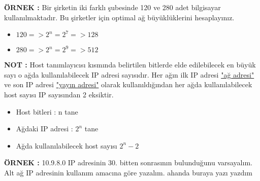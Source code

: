 \textbf{ÖRNEK : }Bir şirketin iki farklı şubesinde 120 ve 280 adet bilgisayar kullanılmaktadır. Bu şirketler için optimal ağ büyüklüklerini hesaplayınız. 

\begin{itemize}
\item[]$120 => 2^n = 2^7 => 128$
\item[]$280 => 2^n = 2^9 => 512$
\end{itemize}

\textbf{NOT : }Host tanımlayıcısı kısmında belirtilen bitlerde elde edilebilecek en büyük sayı o ağda kullanılabilecek IP adresi sayısıdır. Her ağın ilk IP adresi \underline{"ağ adresi"} ve son IP adresi \underline{"yayın adresi"} olarak kullanıldığından her ağda kullanılabilecek host sayısı IP sayısından 2 eksiktir.
\begin{itemize}
\item[] Host bitleri : n tane 
\item[] Ağdaki IP adresi : $2^n$ tane 
\item[] Ağda kullanılabilecek host sayısı $2^n-2$
\end{itemize}

\textbf{ÖRNEK : } 10.9.8.0 IP adresinin 30. bitten sonrasının bulunduğunu varsayalım. Alt ağ IP adresinin kullanım amacına göre yazalım. 
ahanda buraya yazı yazdım
\begin{tabular}{ll}

\end{tabular}





















